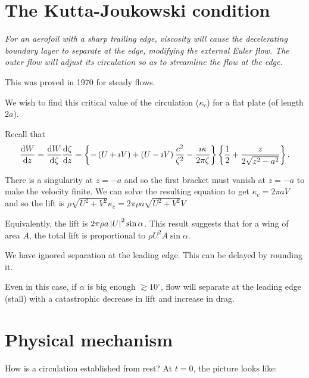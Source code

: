 \documentclass{notes}
\theoremstyle{plain}
\begin{document}
\vspace{1in}

\section{The Kutta-Joukowski condition}

\begin{center}
\parbox{4in}{
\itshape
For an aerofoil with a sharp trailing edge, viscosity will cause the
decelerating boundary layer to separate at the edge, modifying the external
Euler flow.  The outer flow will adjust its circulation so as to streamline
the flow at the edge.}
\end{center}

This was proved in 1970 for steady flows.

We wish to find this critical value of the circulation ($\kappa_c$)
for a flat plate (of length $2 a$).

Recall that
\[
\frac{\mathrm{d} W}{\mathrm{d} z} = \frac{\mathrm{d} W}{\mathrm{d}\zeta} \frac{\mathrm{d}\zeta}{\mathrm{d} z}
= \left\{ - \left(U + \imath V \right) + \left(U - \imath V\right) \frac{c^2}
{\zeta^2} - \frac{\imath \kappa}{2 \pi \zeta} \right\}
\left\{ \frac{1}{2} + \frac{z}{2 \sqrt{z^2 - a^2}}\right\}.
\]

There is a singularity at $z = - a$ and so the first bracket must
vanish at $z = - a$ to make the velocity finite.  We can solve
the resulting equation to get $\kappa_c = 2 \pi a V$ and
so the lift is $\rho \sqrt{U^2 + V^2} \kappa_c = 2 \pi \rho a
\sqrt{U^2 + V^2} V$

\vspace{1in}

Equivalently, the lift is $2 \pi \rho a \left|U\right|^2 \sin \alpha$.
This result suggests that for a wing of area $A$, the total lift
is proportional to $\rho U^2 A \sin \alpha$.

We have ignored separation at the leading edge.  This can be delayed
by rounding it.

\vspace{1in}

Even in this case, if $\alpha$ is big enough $\gtrsim 10^\circ$, flow
will separate at the leading edge (stall) with a catastrophic decrease in
lift and increase in drag.

\section{Physical mechanism}

How is a circulation established from rest?  At $t = 0$, the picture looks
like:
\end{document}

